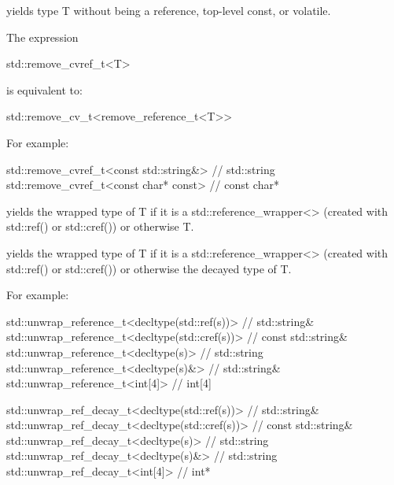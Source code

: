 



yields type T without being a reference, top-level const, or volatile.

The expression

\begin{cpp}
std::remove_cvref_t<T>
\end{cpp}

is equivalent to:

\begin{cpp}
std::remove_cv_t<remove_reference_t<T>>
\end{cpp}

For example:

\begin{cpp}
std::remove_cvref_t<const std::string&> // std::string
std::remove_cvref_t<const char* const> // const char*
\end{cpp}



yields the wrapped type of T if it is a std::reference\_wrapper<> (created with std::ref() or std::cref()) or otherwise T.


yields the wrapped type of T if it is a std::reference\_wrapper<> (created with std::ref() or std::cref()) or otherwise the decayed type of T.

For example:

\begin{cpp}
std::unwrap_reference_t<decltype(std::ref(s))> // std::string&
std::unwrap_reference_t<decltype(std::cref(s))> // const std::string&
std::unwrap_reference_t<decltype(s)> // std::string
std::unwrap_reference_t<decltype(s)&> // std::string&
std::unwrap_reference_t<int[4]> // int[4]

std::unwrap_ref_decay_t<decltype(std::ref(s))> // std::string&
std::unwrap_ref_decay_t<decltype(std::cref(s))> // const std::string&
std::unwrap_ref_decay_t<decltype(s)> // std::string
std::unwrap_ref_decay_t<decltype(s)&> // std::string
std::unwrap_ref_decay_t<int[4]> // int*
\end{cpp}



